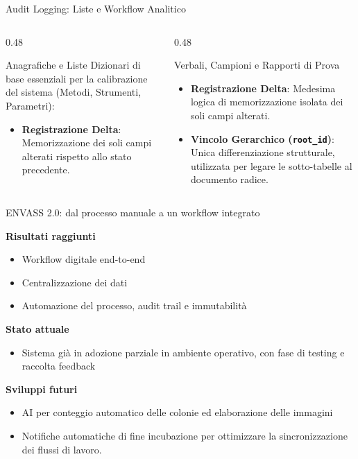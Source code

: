 \documentclass[10pt, aspectratio=169]{beamer}
\begin{document}
\begin{frame}{Audit Logging: Liste e Workflow Analitico}
	\begin{columns}[T]
		\begin{column}{0.48\textwidth}
			\begin{block}{Anagrafiche e Liste}
				Dizionari di base essenziali per la calibrazione del sistema (Metodi, Strumenti, Parametri):
				\begin{itemize}
					\item \textbf{Registrazione Delta}: Memorizzazione dei soli campi alterati rispetto allo stato precedente.
				\end{itemize}
			\end{block}
		\end{column}
		
		\begin{column}{0.48\textwidth}
			\begin{block}{Verbali, Campioni e Rapporti di Prova}
				\begin{itemize}
					\item \textbf{Registrazione Delta}: Medesima logica di memorizzazione isolata dei soli campi alterati.
					\item \textbf{Vincolo Gerarchico (\texttt{root\_id})}: Unica differenziazione strutturale, utilizzata per legare le sotto-tabelle al documento radice.
				\end{itemize}
			\end{block}
		\end{column}
	\end{columns}
\end{frame}

\begin{frame}{ENVASS 2.0: dal processo manuale a un workflow integrato}
	
	\textbf{Risultati raggiunti}
	\begin{itemize}
		\item Workflow digitale end-to-end
		\item Centralizzazione dei dati
		\item Automazione del processo, audit trail e immutabilità
	\end{itemize}
	
	\vspace{0.3cm}
	
	\textbf{Stato attuale}
	\begin{itemize}
		\item Sistema già in adozione parziale in ambiente operativo, con fase di testing e raccolta feedback
	\end{itemize}
	
	\vspace{0.3cm}
	
	\textbf{Sviluppi futuri}
	\begin{itemize}
		\item AI per conteggio automatico delle colonie ed elaborazione delle immagini
		\item Notifiche automatiche di fine incubazione per ottimizzare la sincronizzazione dei flussi di lavoro.
	\end{itemize}

\end{frame}
\end{document}

